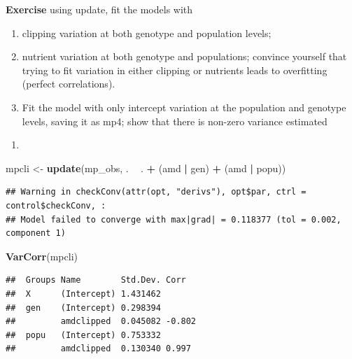 \documentclass[
  12pt,
]{book}
\makeatletter
\newenvironment{Shaded}{\begin{snugshade}}{\end{snugshade}}
\newcommand{\KeywordTok}[1]{\textcolor[rgb]{0.13,0.29,0.53}{\textbf{#1}}}
\newcommand{\NormalTok}[1]{#1}
\newcommand{\OperatorTok}[1]{\textcolor[rgb]{0.81,0.36,0.00}{\textbf{#1}}}
\newcommand{\StringTok}[1]{\textcolor[rgb]{0.31,0.60,0.02}{#1}}
\providecommand{\tightlist}{%
  \setlength{\itemsep}{0pt}\setlength{\parskip}{0pt}}
\newenvironment{kframe}{%
\medskip{}
\setlength{\fboxsep}{.8em}
\def\at@end@of@kframe{}%
\ifinner\ifhmode%
 \def\at@end@of@kframe{\end{minipage}}%
 \begin{minipage}{\columnwidth}%
\fi\fi%
\def\FrameCommand##1{\hskip\@totalleftmargin \hskip-\fboxsep
\colorbox{incolor}{##1}\hskip-\fboxsep
    \hskip-\linewidth \hskip-\@totalleftmargin \hskip\columnwidth}%
\MakeFramed {\advance\hsize-\width
  \@totalleftmargin\z@ \linewidth\hsize
  \@setminipage}}%
{\par\unskip\endMakeFramed%
\at@end@of@kframe}
\newenvironment{rmdblock}[1]
 {
 \begin{itemize}
 \renewcommand{\labelitemi}{
   \raisebox{-.7\height}[0pt][0pt]{
     {\setkeys{Gin}{width=3em,keepaspectratio}\texttt{[image: images/icons/\#1]}}
   }
 }
 \begin{kframe}
 \setlength{\fboxsep}{1em}
 \item
 }
 {
 \end{kframe}
 \end{itemize}
 }
\newenvironment{rmdcode}
  {\begin{rmdblock}{code}}
  {\end{rmdblock}}
\makeatother
\begin{document}
\begin{rmdcode}
\textbf{Exercise} using update, fit the models with

\begin{enumerate}
\def\labelenumi{\arabic{enumi}.}
\tightlist
\item
  clipping variation at both genotype and population levels;
\item
  nutrient variation at both genotype and populations; convince yourself that trying to fit variation in either clipping or nutrients leads to overfitting (perfect correlations).
\item
  Fit the model with only intercept variation at the population and genotype levels, saving it as mp4; show that there is non-zero variance estimated
\end{enumerate}
\end{rmdcode}

\begin{enumerate}
\def\labelenumi{\arabic{enumi}.}
\item
\end{enumerate}

\begin{Shaded}
\begin{Highlighting}[]
\NormalTok{mpcli <-}\StringTok{ }\KeywordTok{update}\NormalTok{(mp_obs, . }\OperatorTok{~}\StringTok{ }\NormalTok{. }\OperatorTok{+}\StringTok{ }\NormalTok{(amd }\OperatorTok{|}\StringTok{ }\NormalTok{gen) }\OperatorTok{+}\StringTok{ }\NormalTok{(amd }\OperatorTok{|}\StringTok{ }\NormalTok{popu))}
\end{Highlighting}
\end{Shaded}

\begin{verbatim}
## Warning in checkConv(attr(opt, "derivs"), opt$par, ctrl = control$checkConv, :
## Model failed to converge with max|grad| = 0.118377 (tol = 0.002, component 1)
\end{verbatim}

\begin{Shaded}
\begin{Highlighting}[]
\KeywordTok{VarCorr}\NormalTok{(mpcli)}
\end{Highlighting}
\end{Shaded}

\begin{verbatim}
##  Groups Name        Std.Dev. Corr  
##  X      (Intercept) 1.431462       
##  gen    (Intercept) 0.298394       
##         amdclipped  0.045082 -0.802
##  popu   (Intercept) 0.753332       
##         amdclipped  0.130340 0.997
\end{verbatim}
\end{document}
